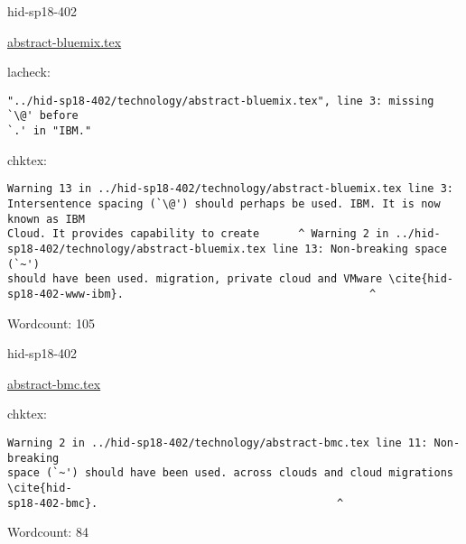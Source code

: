 \begin{IU}

hid-sp18-402

\href{https://github.com/cloudmesh-community/hid-sp18-402/blob/master//technology/abstract-bluemix.tex}{abstract-bluemix.tex}

 
lacheck:
\begin{tiny}
\begin{verbatim}
"../hid-sp18-402/technology/abstract-bluemix.tex", line 3: missing `\@' before
`.' in "IBM."
\end{verbatim}
\end{tiny}
chktex:
\begin{tiny}
\begin{verbatim}
Warning 13 in ../hid-sp18-402/technology/abstract-bluemix.tex line 3:
Intersentence spacing (`\@') should perhaps be used. IBM. It is now known as IBM
Cloud. It provides capability to create      ^ Warning 2 in ../hid-
sp18-402/technology/abstract-bluemix.tex line 13: Non-breaking space (`~')
should have been used. migration, private cloud and VMware \cite{hid-
sp18-402-www-ibm}.                                      ^
\end{verbatim}
\end{tiny}

Wordcount: 105

\end{IU}



\begin{IU}

hid-sp18-402

\href{https://github.com/cloudmesh-community/hid-sp18-402/blob/master//technology/abstract-bmc.tex}{abstract-bmc.tex}

 
chktex:
\begin{tiny}
\begin{verbatim}
Warning 2 in ../hid-sp18-402/technology/abstract-bmc.tex line 11: Non-breaking
space (`~') should have been used. across clouds and cloud migrations \cite{hid-
sp18-402-bmc}.                                     ^
\end{verbatim}
\end{tiny}

Wordcount: 84

\end{IU}



